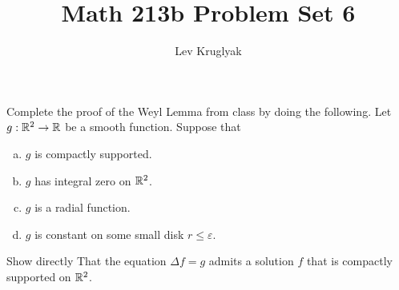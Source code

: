 \documentclass[expanded]{lkx_pset}
\title{Math 213b Problem Set 6}
\author{Lev Kruglyak}
\begin{document}
\maketitle

\begin{problem}{1}
Complete the proof of the Weyl Lemma from class by doing the following. Let $g : \mathbb{R}^2 \to \mathbb{R}$ be a smooth function. Suppose that
\begin{enumerate}[(a)]
	\item $g$ is compactly supported.
	\item $g$ has integral zero on $\mathbb{R}^2$.
	\item $g$ is a radial function.
	\item $g$ is constant on some small disk $r\leq \varepsilon$.
\end{enumerate}
Show directly That the equation $\Delta f = g$ admits a solution $f$ that is compactly supported on $\mathbb{R}^2$. %
\end{problem}
\end{document}
